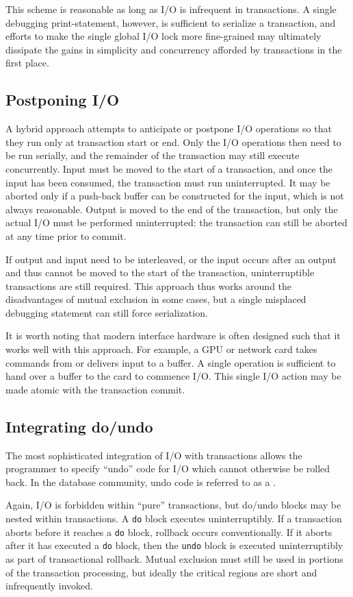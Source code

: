 This scheme is reasonable as long as I/O is infrequent in transactions.
A single debugging print-statement, however, is sufficient to
serialize a transaction, and efforts to make the single global I/O
lock more fine-grained may ultimately dissipate the gains in
simplicity and concurrency afforded by transactions in the first place.

\subsection{Postponing I/O}
A hybrid approach attempts to anticipate or postpone I/O operations so
that they run only at transaction start or end.
Only the I/O operations then need to be run serially, and the remainder of
the transaction may still execute concurrently.  Input must be moved
to the start of a transaction, and once the input has been consumed,
the transaction must run uninterrupted.  It may be aborted
only if a push-back buffer can be constructed for the input, which is
not always reasonable.  Output is moved to the end of the transaction,
but only the actual I/O must be performed uninterrupted: the
transaction can still be aborted at any time prior to commit.

If output and input need to be interleaved, or the input occurs after
an output and thus cannot be moved to the start of the transaction,
uninterruptible transactions are still required.  This approach thus
works around the disadvantages of mutual exclusion in some cases, but
a single misplaced debugging statement can still force serialization.

It is worth noting that modern interface hardware is often designed
such that it works well with this approach.  For example, a GPU
or network card takes commands from or delivers input to a
buffer.  A single operation is sufficient to hand over a buffer to
the card to commence I/O\@.  This single I/O action may be made atomic
with the transaction commit.

\subsection{Integrating do/undo}
The most sophisticated integration of I/O with transactions allows the
programmer to specify ``undo'' code for I/O which cannot otherwise be
rolled back.  In the database community, undo code is referred to as a
.

Again, I/O is forbidden within ``pure'' transactions, but
do/undo blocks may be nested within transactions.  A \texttt{do} block
executes uninterruptibly.  If a transaction aborts before it reaches a
\texttt{do} block, rollback occurs conventionally.  If it aborts after it
has executed a \texttt{do} block, then the \texttt{undo} block is
executed uninterruptibly as part of transactional rollback.
Mutual exclusion must still be used in portions of the transaction
processing, but ideally the critical regions are short and infrequently
invoked.

